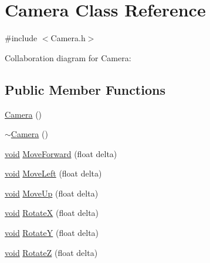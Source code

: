 \hypertarget{class_camera}{\section{Camera Class Reference}
\label{class_camera}
}


{\ttfamily \#include $<$Camera.\-h$>$}



Collaboration diagram for Camera\-:
\subsection*{Public Member Functions}
\begin{DoxyCompactItemize}
\item 
\hyperlink{class_camera_a01f94c3543f56ede7af49dc778f19331}{Camera} ()
\item 
\hyperlink{class_camera_ad1897942d0ccf91052386388a497349f}{$\sim$\-Camera} ()
\item 
\hyperlink{_s_d_l__opengl_8h_a3db05964a3cc4410f35b7ea2b7eb850d}{void} \hyperlink{class_camera_afec9df7d6f9b20c4d0f80a4b7f1e7b45}{Move\-Forward} (float delta)
\item 
\hyperlink{_s_d_l__opengl_8h_a3db05964a3cc4410f35b7ea2b7eb850d}{void} \hyperlink{class_camera_a10ec2d162d88a981ea49f4c337c6f7b9}{Move\-Left} (float delta)
\item 
\hyperlink{_s_d_l__opengl_8h_a3db05964a3cc4410f35b7ea2b7eb850d}{void} \hyperlink{class_camera_ac2d7fe9d72ad9c5da32a07f1c68aa80f}{Move\-Up} (float delta)
\item 
\hyperlink{_s_d_l__opengl_8h_a3db05964a3cc4410f35b7ea2b7eb850d}{void} \hyperlink{class_camera_ad245606a9d04c00aeb256be40591cdcd}{Rotate\-X} (float delta)
\item 
\hyperlink{_s_d_l__opengl_8h_a3db05964a3cc4410f35b7ea2b7eb850d}{void} \hyperlink{class_camera_a63e68a46eb7144d38bf19573d2bd2705}{Rotate\-Y} (float delta)
\item 
\hyperlink{_s_d_l__opengl_8h_a3db05964a3cc4410f35b7ea2b7eb850d}{void} \hyperlink{class_camera_a24eacb152b9d517b8f7205017eb4d149}{Rotate\-Z} (float delta)
\end{DoxyCompactItemize}
